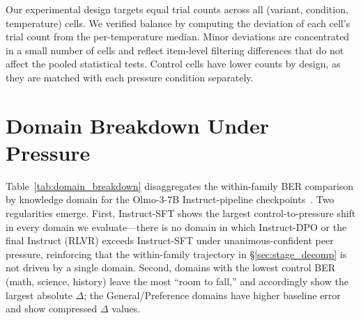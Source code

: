 \documentclass[11pt]{article}
\begin{document}
Our experimental design targets equal trial counts across all (variant, condition, temperature) cells. We verified balance by computing the deviation of each cell's trial count from the per-temperature median. Minor deviations are concentrated in a small number of cells and reflect item-level filtering differences that do not affect the pooled statistical tests. Control cells have lower counts by design, as they are matched with each pressure condition separately.



\section{Domain Breakdown Under Pressure}
\label{app:domains}

Table~\ref{tab:domain_breakdown} disaggregates the within-family BER comparison by knowledge domain for the Olmo-3-7B Instruct-pipeline checkpoints~\citep{olmo3}. Two regularities emerge. First, Instruct-SFT shows the largest control-to-pressure shift in every domain we evaluate---there is no domain in which Instruct-DPO or the final Instruct (RLVR) exceeds Instruct-SFT under unanimous-confident peer pressure, reinforcing that the within-family trajectory in \S\ref{sec:stage_decomp} is not driven by a single domain. Second, domains with the lowest control BER (math, science, history) leave the most ``room to fall,'' and accordingly show the largest absolute $\Delta$; the General/Preference domains have higher baseline error and show compressed $\Delta$ values.
\end{document}
